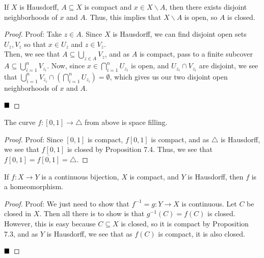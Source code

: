 \begin{lemma}
    If $X$ is Hausdorff, $A \subseteq X$ is compact and $x \in X \backslash A$, then there exists disjoint neighborhoods of $x$ and $A$. Thus, this implies that $X \backslash A$ is open, so $A$ is closed.
\end{lemma}
\begin{proof}{Proof:}
    Take $z \in A$. Since $X$ is Hausdorff, we can find disjoint open sets $U_{z}, V_{z}$ so that $x \in U_{z}$ and $z \in V_{z}$.\\

    Then, we see that $A \subseteq \bigcup_{z \in A} V_{z}$, and as $A$ is compact, pass to a finite subcover $A \subseteq \bigcup_{i = 1}^{n} V_{z_{i}}$. Now, since $x \in \bigcap_{i = 1}^{n} U_{z_{i}}$ is open, and $U_{z_{i}} \cap V_{z_{i}}$ are disjoint, we see that $\bigcup_{i = 1}^{n} V_{z_{i}} \cap \left(\bigcap_{i = 1}^{n} U_{z_{i}}\right) = \emptyset$, which gives us our two disjoint open neighborhoods of $x$ and $A$. 

    $\qed$
\end{proof}

\begin{lemma}
    The curve $f : [0, 1] \to \triangle$ from above is space filling.
\end{lemma}
\begin{proof}{Proof:}
    Since $[0, 1]$ is compact, $f[0, 1]$ is compact, and as $\triangle$ is Hausdorff, we see that $f[0, 1]$ is closed by Proposition 7.4. Thus, we see that $f[0, 1] = \overline{f[0, 1]} = \triangle$. 
\end{proof}

\begin{lemma}
    If $f : X \to Y$ is a continuous bijection, $X$ is compact, and $Y$ is Hausdorff, then $f$ is a homeomorphism.
\end{lemma}
\begin{proof}{Proof:}
    We just need to show that $f^{-1} = g : Y \to X$ is continuous. Let $C$ be closed in $X$. Then all there is to show is that $g^{-1}(C) = f(C)$ is closed.\\

    However, this is easy because $C \subseteq X$ is closed, so it is compact by Proposition 7.3, and as $Y$ is Hausdorff, we see that as $f(C)$ is compact, it is also closed.

    $\qed$
\end{proof}

